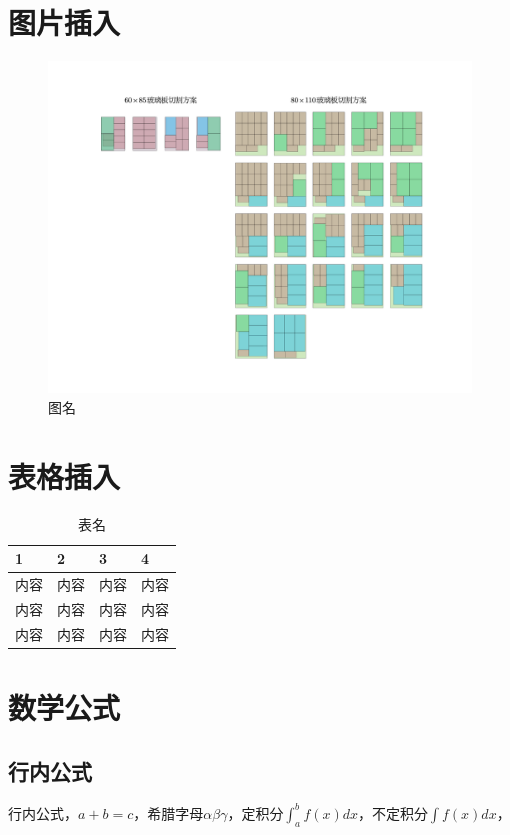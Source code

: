 \documentclass[a4paper,AutoFakeBold]{ctexart} %
\begin{document}
\section{图片插入}
\begin{figure}[htbp]
	\centering
	\includegraphics[width=0.65\linewidth]{Cut_Method_Glass}
	\caption{图名}\label{图名}
\end{figure}
\section{表格插入}
\begin{table}[htbp]%
	\caption{表名}\label{表名}
	\centering
	\begin{tabular}{p{3cm}<{\centering} p{3cm}<{\centering} p{3cm}<{\centering} p{3cm}<{\centering}}
		\toprule[1.5pt]
		1&2&3&4\\
		\midrule[0.75pt]
		内容&内容&内容&内容\\
		内容&内容&内容&内容\\
		内容&内容&内容&内容\\
		\bottomrule[1pt]
	\end{tabular}
\end{table}
\section{数学公式}
\subsection{行内公式}
行内公式，$a+b=c$，希腊字母$\alpha\beta\gamma$，定积分$\int_{a}^{b} f(x)dx$，不定积分$\int f(x)dx$，
\end{document}
